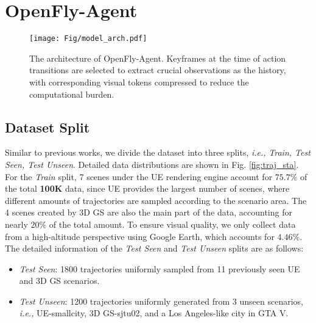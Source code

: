 \section{OpenFly-Agent}
\begin{figure*}[t]
\centering
    \texttt{[image: Fig/model\_arch.pdf]}
    \caption{The architecture of OpenFly-Agent. Keyframes at the time of action transitions are selected to extract crucial observations as the history, with corresponding visual tokens compressed to reduce the computational burden.}
    \label{fig:model}
\end{figure*}

\subsection{Dataset Split}
\label{data_split}
Similar to previous works, we divide the dataset into three splits, \emph{i.e.,}  \textit{Train, Test Seen, Test Unseen}. Detailed data distributions are shown in Fig. \ref{fig:traj_sta}. For the \textit{Train} split, 7 scenes under the UE rendering engine account for $75.7\%$ of the total \textbf{100K} data, since UE provides the largest number of scenes, where different amounts of trajectories are sampled according to the scenario area. The 4 scenes created by 3D GS are also the main part of the data, accounting for nearly $20\%$ of the total amount. To ensure visual quality, we only collect data from a high-altitude perspective using Google Earth, which accounts for $4.46\%$. 
The detailed information of the \textit{Test Seen} and \textit{Test Unseen} splits are as follows:
\begin{itemize}[left=0pt]
    \item \textit{Test Seen}: 1800 trajectories uniformly sampled from 11 previously seen UE and 3D GS scenarios.

    \item \textit{Test Unseen}: 1200 trajectories uniformly generated from 3 unseen scenarios, \emph{i.e.,} UE-smallcity, 3D GS-sjtu02, and a Los Angeles-like city in GTA V.
\end{itemize}


%